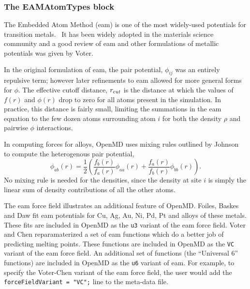 \documentclass[]{book}
\begin{document}
\subsubsection{\label{section:ffEAM}The EAMAtomTypes block}
The Embedded Atom Method ({\sc eam}) is one of the most widely-used
potentials for transition
metals.~\cite{Finnis84,Ercolessi88,Chen90,Qi99,Ercolessi02,Daw84,FBD86,johnson89,Lu97}
It has been widely adopted in the materials science community and a
good review of {\sc eam} and other formulations of metallic potentials
was given by Voter.\cite{Voter:95}

In the original formulation of {\sc eam}\cite{Daw84}, the pair
potential, $\phi_{ij}$ was an entirely repulsive term; however later
refinements to {\sc eam} allowed for more general forms for
$\phi$.\cite{Daw89} The effective cutoff distance, $r_{{\text cut}}$
is the distance at which the values of $f(r)$ and $\phi(r)$ drop to
zero for all atoms present in the simulation.  In practice, this
distance is fairly small, limiting the summations in the {\sc eam}
equation to the few dozen atoms surrounding atom $i$ for both the
density $\rho$ and pairwise $\phi$ interactions.

In computing forces for alloys, OpenMD uses mixing rules outlined by
Johnson~\cite{johnson89} to compute the heterogenous pair potential,
\begin{equation}
\label{eq:johnson}
\phi_{ab}(r)=\frac{1}{2}\left(
\frac{f_{b}(r)}{f_{a}(r)}\phi_{aa}(r)+
\frac{f_{a}(r)}{f_{b}(r)}\phi_{bb}(r)
\right).
\end{equation}
No mixing rule is needed for the densities, since the density at site
$i$ is simply the linear sum of density contributions of all the other
atoms.

The {\sc eam} force field illustrates an additional feature of {\sc
OpenMD}.  Foiles, Baskes and Daw fit {\sc eam} potentials for Cu, Ag,
Au, Ni, Pd, Pt and alloys of these metals.\cite{FBD86} These fits are
included in {\sc OpenMD} as the {\tt u3} variant of the {\sc eam} force
field.  Voter and Chen reparamaterized a set of {\sc eam} functions
which do a better job of predicting melting points.\cite{Voter:87}
These functions are included in {\sc OpenMD} as the {\tt VC} variant of
the {\sc eam} force field.  An additional set of functions (the
``Universal 6'' functions) are included in {\sc OpenMD} as the {\tt u6}
variant of {\sc eam}.  For example, to specify the Voter-Chen variant
of the {\sc eam} force field, the user would add the {\tt
forceFieldVariant = "VC";} line to the meta-data file.
\end{document}
